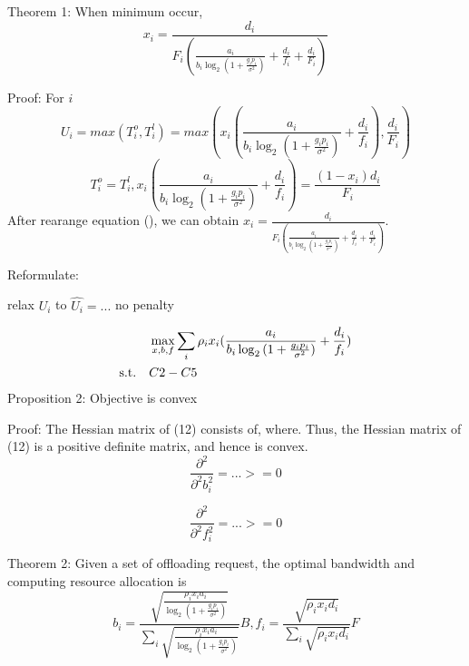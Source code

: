 \documentclass{article}
\begin{document}
Theorem 1:
When minimum occur, 
\begin{equation}
x_{i}=\frac{d_{i}}{ F_{i}(\frac{a_{i}}{b_{i}\log_{2}{ (1+\frac{g_{i}p_{i}}{ \sigma^{2} } )}} + \frac{d_{i}}{f_{i}}+\frac{d_{i}}{F_{i}}) }
\end{equation}

Proof:
For $i$
\begin{equation}
U_{i}=max(T_{i}^{o}, T_{i}^{l})=max(x_{i}(\frac{a_{i}}{b_{i}\log_{2}{ (1+\frac{g_{i}p_{i}}{ \sigma^{2} } )}} + \frac{d_{i}}{f_{i}}), \frac{d_{i}}{F_{i}})
\end{equation}
\begin{equation}
T_{i}^{o}=T_{i}^{l}, x_{i}(\frac{ a_{i} }{ b_{i}\log_{2}{ (1+\frac{g_{i}p_{i}}{ \sigma^{2} } )} } + \frac{d_{i}}{f_{i}})= \frac{ (1-x_{i})d_{i} }{F_{i}}
\end{equation}
After rearange equation (), we can obtain $x_{i}=\frac{d_{i}}{ F_{i}(\frac{a_{i}}{b_{i}\log_{2}{ (1+\frac{g_{i}p_{i}}{ \sigma^{2} } )}} + \frac{d_{i}}{f_{i}}+\frac{d_{i}}{F_{i}}) }$.

Reformulate:

relax $U_{i}$ to $\hat{U_{i}}=...$ no penalty

\begin{align}\
& \max_{x,b,f} \sum_{i}\rho_{i}x_{i}(\frac{a_{i}}{b_{i}\log_{2}{ (1+\frac{g_{i}p_{i}}{ \sigma^{2} } )} }+\frac{d_{i}}{f_{i}})  \nonumber\\
\rm{s.t.} \quad &C2-C5 \nonumber\\
\end{align}
Proposition 2:
Objective is convex

Proof:
The Hessian matrix of (12) consists of, where. Thus, the Hessian matrix of (12) is a positive definite matrix, and hence is convex.
\begin{equation}
\frac{\partial^{2}}{\partial^{2}b^{2}_{i}}= ... >=0
\end{equation}

\begin{equation}
\frac{\partial^{2}}{\partial^{2}f^{2}_{i}}= ... >=0
\end{equation}

Theorem 2:
Given a set of offloading request, the optimal bandwidth and computing resource allocation is
\begin{equation}
b_{i}=\frac{\sqrt{\frac{\rho_{i}x_{i}a_{i}}{\log_{2}{ (1+\frac{g_{i}p_{i}}{ \sigma^{2} } )} }}}{\sum_{i}\sqrt{\frac{\rho_{i}x_{i}a_{i}}{\log_{2}{ (1+\frac{g_{i}p_{i}}{ \sigma^{2} } )} }}}B, f_{i}=\frac{ \sqrt{ \rho_{i}x_{i}d_{i}} } { \sum_{i}\sqrt{\rho_{i}x_{i}d_{i}} }F
\end{equation}
\end{document}
